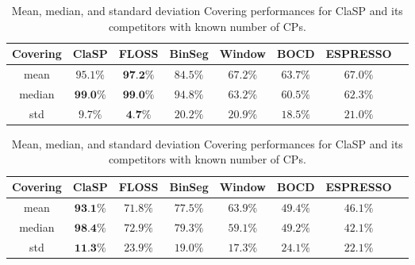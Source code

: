 \documentclass[pdflatex,sn-basic]{sn-jnl}
\begin{document}
\begin{table}[t]
	\caption{Mean, median, and standard deviation Covering performances for ClaSP and its competitors with known number of CPs. \label{tab:semi-supervised_summary}}
	\begin{minipage}{12cm}
	\begin{centering}
		\begin{tabular}{c|ccccccc}
			\toprule 			
			Covering & ClaSP & FLOSS & BinSeg & Window & BOCD & ESPRESSO\tabularnewline
			\hline 
			 mean & $95.1\%$ & $\textbf{97.2\%}$ & $84.5\%$ & $67.2\%$ & $63.7\%$ & $67.0\%$ \tabularnewline
			 median & $\textbf{99.0\%}$ & $\textbf{99.0\%}$ & $94.8\%$ &$63.2\%$ & $60.5\%$ & $62.3\%$ \tabularnewline
			 std & $9.7\%$ & $\textbf{4.7\%}$ & $20.2\%$ & $20.9\%$ & $18.5\%$ & $21.0\%$ \tabularnewline
			\bottomrule 			
		\end{tabular}
	\par\end{centering}
	\end{minipage}
	\begin{minipage}{12cm}
	\begin{centering}
		\begin{tabular}{c|ccccccc}
			\toprule 			
			Covering & ClaSP & FLOSS & BinSeg & Window & BOCD & ESPRESSO\tabularnewline
			\hline 
			 mean & $\textbf{93.1\%}$ & $71.8\%$ & $77.5\%$ & $63.9\%$ & $49.4\%$ & $46.1\%$ \tabularnewline
			 median & $\textbf{98.4\%}$ & $72.9\%$ & $79.3\%$ &$59.1\%$ & $49.2\%$ & $42.1\%$ \tabularnewline
			 std & $\textbf{11.3\%}$ & $23.9\%$ & $19.0\%$ & $17.3\%$ & $24.1\%$ & $22.1\%$ \tabularnewline
			\bottomrule 			
		\end{tabular}
	\par\end{centering}
	\end{minipage}
\end{table}
\end{document}
